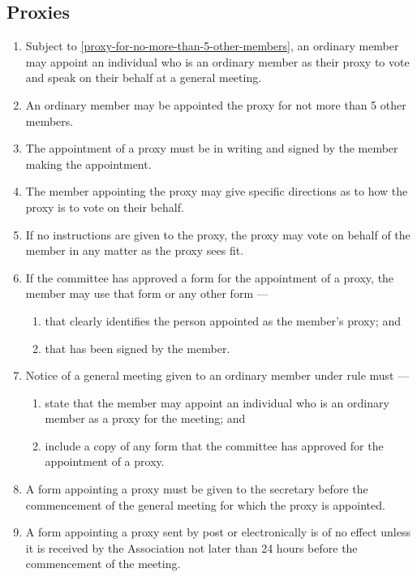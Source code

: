 \documentclass[../constitution.tex]{subfiles}
\begin{document}
\hypertarget{proxies}{%
\subsection{Proxies}\label{proxies}}

\begin{enumerate}

\item Subject to  \ref{proxy-for-no-more-than-5-other-members}, an ordinary member may appoint an individual who is an ordinary member as their proxy to vote and speak on their behalf at a general meeting.
\item An ordinary member may be appointed the proxy for not more than 5 other members. \label{proxy-for-no-more-than-5-other-members}
\item The appointment of a proxy must be in writing and signed by the member making the appointment.
\item The member appointing the proxy may give specific directions as to how the proxy is to vote on their behalf.
\item If no instructions are given to the proxy, the proxy may vote on behalf of the member in any matter as the proxy sees fit.
\item If the committee has approved a form for the appointment of a proxy, the member may use that form or any other form ---

  \begin{enumerate}
  
  \item that clearly identifies the person appointed as the member's proxy; and
  \item that has been signed by the member.
  \end{enumerate}
\item Notice of a general meeting given to an ordinary member under rule  must --- \label{notice-of-meeting-to-appointed-proxy}

  \begin{enumerate}
  
  \item state that the member may appoint an individual who is an ordinary member as a proxy for the meeting; and
  \item include a copy of any form that the committee has approved for the appointment of a proxy.
  \end{enumerate}
\item A form appointing a proxy must be given to the secretary before the commencement of the general meeting for which the proxy is appointed. \label{form-appointing-proxy-before-general-meeting}
\item A form appointing a proxy sent by post or electronically is of no effect unless it is received by the Association not later than 24 hours before the commencement of the meeting.
\end{enumerate}
\end{document}
